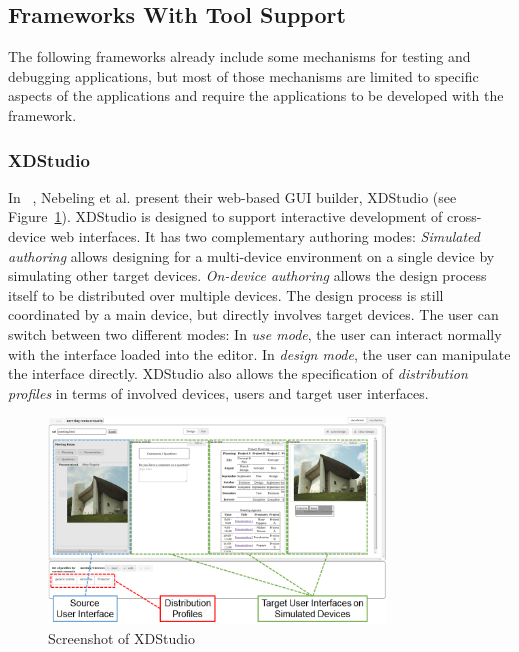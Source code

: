 \subsection{Frameworks With Tool Support}

The following frameworks already include some mechanisms for testing and debugging applications, but most of those mechanisms are limited to specific aspects of the applications and require the applications to be developed with the framework.

\subsubsection{XDStudio}

In ~\cite{xdstudio2014}, Nebeling et al. present their web-based GUI builder, XDStudio (see Figure~\ref{fig:xdstudio}). XDStudio is designed to support interactive development of cross-device web interfaces. It has two complementary authoring modes: \emph{Simulated authoring} allows designing for a multi-device environment on a single device by simulating other target devices. \emph{On-device authoring} allows the design process itself to be distributed over multiple devices. The design process is still coordinated by a main device, but directly involves target devices. The user can switch between two different modes: In \emph{use mode}, the user can interact normally with the interface loaded into the editor. In \emph{design mode}, the user can manipulate the interface directly. XDStudio also allows the specification of \emph{distribution profiles} in terms of involved devices, users and target user interfaces.

\begin{figure}[H]
  \centering
    \includegraphics[width=0.8\textwidth]{images/relatedwork/xdstudio.png}
	\caption[Screenshot: XDStudio]{Screenshot of XDStudio}
	\label{fig:xdstudio}
\end{figure}

